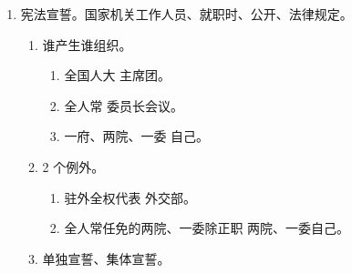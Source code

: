 \begin{enumerate}
\begin{enumerate}
\begin{enumerate}
                \end{enumerate}
          \item 处理。
                \begin{enumerate}
                  \item 书面审查意见（开会 \hz 直接给） \yjt 不改 \yjt 提案给委员长会议撤销（最后沟通） \yjt 常委会。。
                  \item 应当反馈，可以公开。
                \end{enumerate}
        \end{enumerate}
  \item 宪法宣誓。国家机关工作人员、就职时、公开、法律规定。
        \begin{enumerate}
          \item 谁产生谁组织。
                \begin{enumerate}
                  \item 全国人大 \yjt 主席团。
                  \item 全人常 \yjt 委员长会议。
                  \item 一府、两院、一委 \yjt 自己。
                \end{enumerate}
          \item 2 个例外。
                \begin{enumerate}
                  \item 驻外全权代表 \yjt 外交部。
                  \item 全人常任免的两院、一委除正职 \yjt 两院、一委自己。
                \end{enumerate}
          \item 单独宣誓、集体宣誓。
        \end{enumerate}
\end{enumerate}
